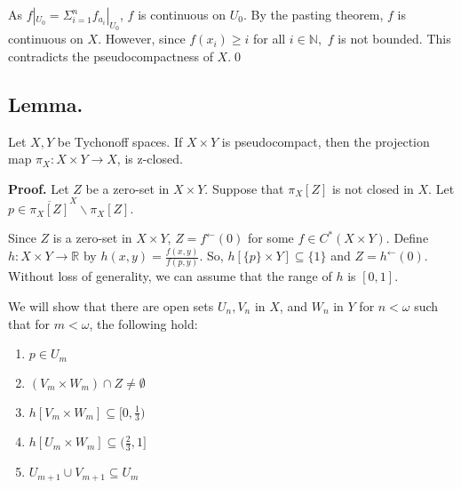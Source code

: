 \documentclass{article}
\begin{document}
\vskip 20pt
As $f|_{U_0} = \Sigma_{i=1}^{n} f_{a_i} |_{U_0}$, $f$ is continuous on $U_0$. By the pasting theorem, $f$ is continuous on $X$.
However, since $f(x_i) \geq i$ for all $i\in \mathbb{N},$ $f$ is  not bounded. This contradicts the pseudocompactness of $X$.\qed










\vskip 40pt













\subsection{Lemma.} Let $X, Y$ be Tychonoff spaces. If $X\times Y$ is pseudocompact, then the projection map $\pi_X: X\times Y\rightarrow X$, is z-closed. 

\vskip 20pt

\textbf{Proof.} Let $Z$ be a zero-set in $X\times Y$. Suppose that $\pi_X[Z]$ is not closed in $X$. Let $p\in \overline{\pi_X[Z]}^X\backslash \pi_X[Z].$ 

\vskip 15pt

Since $Z$ is a zero-set in $X\times Y$, $Z=f^\leftarrow (0)$ for some $f\in C^*(X\times Y).$ Define $h: X\times Y\rightarrow \mathbb{R}$ by $h(x,y)=\frac{f(x,y)}{f(p,y)}$. So, $h\left[\{p\}\times Y\right] \subseteq \{1\}$ and $Z=h^\leftarrow (0).$ Without loss of generality, we can assume that the range of $h$ is $[0,1]$. 
\vskip 10pt

We will show that there are open sets $U_n, V_n$ in $X$, and $W_n$ in $Y$ for $n<\omega$ such that for $m<\omega$, the following hold: 

\begin{enumerate}
	\item $p\in U_m$
	\item $(V_m\times W_m)\cap Z \neq \emptyset$
	\item $h\left[V_m\times W_m\right] \subseteq [0,\frac{1}{3})$
	\item $h\left[U_m\times W_m\right] \subseteq (\frac{2}{3},1]$
	\item $U_{m+1}\cup V_{m+1}\subseteq U_m$
\end{enumerate}

\vskip 5pt
\end{document}

